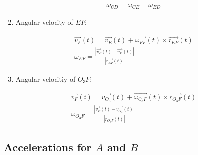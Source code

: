 \begin{enumerate}
\begin{answer}
              \begin{align}
                  \omega_{CD} = \omega_{CE} = \omega_{ED}
              \end{align}
          \end{answer}
    \item Angular velocity of $EF$:
          \begin{answer}

              \begin{align}
                  \vec{v_F}(t) = \vec{v_E}(t) + \vec{\omega_{EF}}(t) \times \vec{r_{EF}}(t) \\
                  \omega_{EF} = \frac{|\vec{v_F}(t) - \vec{v_E}(t)|}{|\vec{r_{EF}}(t)|}
              \end{align}
          \end{answer}
    \item Angular velocitiy of $O_3F$:
          \begin{answer}

              \begin{align}
                  \vec{v_F}(t) = \vec{v_{O_3}}(t) + \vec{\omega_{O_3F}}(t) \times \vec{r_{O_3F}}(t) \\
                  \omega_{O_3F} = \frac{|\vec{v_F}(t) - \vec{v_{O_3}}(t)|}{|\vec{r_{O_3F}}(t)|}
              \end{align}
          \end{answer}
\end{enumerate}

\subsection{Accelerations for $A$ and $B$}

